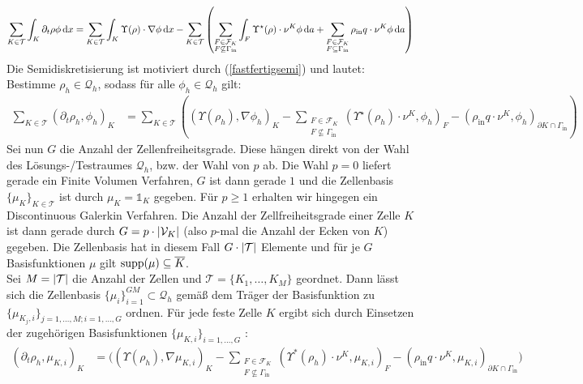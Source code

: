 \begin{align}
	\label{fastfertigsemi}
	\sum_{K \in \mathcal{T}} \int_K \partial_t \rho  \phi \, \mathrm{d} x = \sum_{K \in \mathcal{T}} \int_K \Upsilon(\rho ) \cdot \nabla \phi \, \mathrm{d} x - 	\sum_{K\in \mathcal{T}} \left( \sum_{\substack{F \in \mathcal{F}_K \\ F \not\subseteq \Gamma_{\text{in}}}} \int_F \Upsilon^{\star}(\rho) \cdot \nu^K \phi \, \mathrm{d} a + \sum_{\substack{F \in \mathcal{F}_K \\ F \subseteq \Gamma_{\text{in}}}} \rho_{\text{in}} q \cdot \nu^K \phi \, \mathrm{d} a \right)
\end{align}
 Die Semidiskretisierung ist motiviert durch (\ref{fastfertigsemi}) und lautet: Bestimme  $\rho_h \in \mathcal{Q}_h$, sodass für alle $ \phi_h \in \mathcal{Q}_h $ gilt:
\begin{align}
	\label{Semidiskretisierung}
	\sum_{K \in \mathcal{T}} (\partial_t \rho_h, \phi_h)_{K} &= \sum_{K \in \mathcal{T}} \left( (\Upsilon(\rho_h), \nabla \phi_h)_{K} - \sum_{\substack{F \in \mathcal{F}_K \\ F \not \subseteq \Gamma_{\text{in}}}}(\Upsilon^{\star}(\rho_h)\cdot \nu^K,\phi_h)_{F} - (\rho_{\text{in}}q \cdot \nu^K,\phi_h)_{\partial K \cap \Gamma_{\text{in}}} \right)
\end{align}
 Sei nun $ G $ die Anzahl der Zellenfreiheitsgrade. Diese hängen direkt von der Wahl des Lösungs-/Testraumes $ \mathcal{Q}_h $, bzw. der Wahl von $ p $ ab. Die Wahl $ p=0 $ liefert gerade ein Finite Volumen Verfahren, $ G $ ist dann gerade $ 1 $ und die Zellenbasis $ \{\mu_K \}_{K \in \mathcal{T}}$ ist durch $ \mu_K =  \mathds{1}_{K} $ gegeben.
 Für $ p \geq 1 $ erhalten wir hingegen ein Discontinuous Galerkin Verfahren. Die Anzahl der Zellfreiheitsgrade einer Zelle $ K $ ist dann gerade durch $ G = p \cdot | \mathcal{V}_K | $ (also $ p $-mal die Anzahl der Ecken von $ K $) gegeben.
 Die Zellenbasis hat in diesem Fall $ G \cdot | \mathcal{T} | $ Elemente und für je $ G $ Basisfunktionen $ \mu $ gilt $ \operatorname{supp}(\mu) \subseteq \overline{K} $. \\
 Sei $ M = | \mathcal{T} | $ die Anzahl der Zellen und $ \mathcal{T} = \{K_1,\dots,K_M \} $ geordnet. Dann lässt sich die Zellenbasis $ \{ \mu_i \}_{i=1}^{GM} \subset \mathcal{Q}_h $ gemäß dem Träger der Basisfunktion zu $ \{ \mu_{K_j,i} \}_{j = 1,\dots,M ; i = 1,\dots,G } $ ordnen.
 Für jede feste Zelle $ K $ ergibt sich durch Einsetzen der zugehörigen Basisfunktionen $ \{ \mu_{K,i} \}_{i = 1,\dots,G }  $ : \\
\begin{align*} 
\left(\partial_t \rho_h, \mu_{K,i}  \right)_{K}  &= \bigg( \left(\Upsilon(\rho_h), \nabla\mu_{K,i}\right)_{K} - \sum_{\substack{F \in \mathcal{F}_{K} \\ F \not\subseteq \Gamma_{\text{in}}}} \left(\Upsilon^*(\rho_h) \cdot \nu^{K}, \mu_{K,i} \right)_{F} - \left(\rho_{\text{in}} q \cdot \nu^{K}, \mu_{K,i} \right)_{\partial K \cap \Gamma_{\text{in}}} \bigg) \\
\end{align*}
